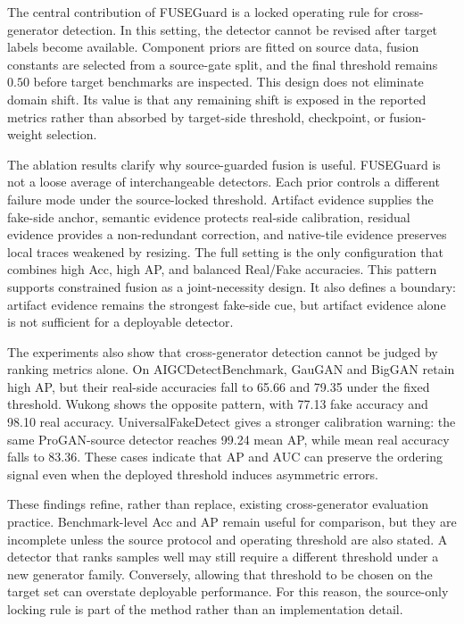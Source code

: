 \documentclass[lettersize,journal]{IEEEtran}
\begin{document}
The central contribution of FUSEGuard is a locked operating rule for cross-generator detection. In this setting, the detector cannot be revised after target labels become available. Component priors are fitted on source data, fusion constants are selected from a source-gate split, and the final threshold remains $0.50$ before target benchmarks are inspected. This design does not eliminate domain shift. Its value is that any remaining shift is exposed in the reported metrics rather than absorbed by target-side threshold, checkpoint, or fusion-weight selection.

The ablation results clarify why source-guarded fusion is useful. FUSEGuard is not a loose average of interchangeable detectors. Each prior controls a different failure mode under the source-locked threshold. Artifact evidence supplies the fake-side anchor, semantic evidence protects real-side calibration, residual evidence provides a non-redundant correction, and native-tile evidence preserves local traces weakened by resizing. The full setting is the only configuration that combines high Acc, high AP, and balanced Real/Fake accuracies. This pattern supports constrained fusion as a joint-necessity design. It also defines a boundary: artifact evidence remains the strongest fake-side cue, but artifact evidence alone is not sufficient for a deployable detector.

The experiments also show that cross-generator detection cannot be judged by ranking metrics alone. On AIGCDetectBenchmark, GauGAN and BigGAN retain high AP, but their real-side accuracies fall to 65.66 and 79.35 under the fixed threshold. Wukong shows the opposite pattern, with 77.13 fake accuracy and 98.10 real accuracy. UniversalFakeDetect gives a stronger calibration warning: the same ProGAN-source detector reaches 99.24 mean AP, while mean real accuracy falls to 83.36. These cases indicate that AP and AUC can preserve the ordering signal even when the deployed threshold induces asymmetric errors.

These findings refine, rather than replace, existing cross-generator evaluation practice. Benchmark-level Acc and AP remain useful for comparison, but they are incomplete unless the source protocol and operating threshold are also stated. A detector that ranks samples well may still require a different threshold under a new generator family. Conversely, allowing that threshold to be chosen on the target set can overstate deployable performance. For this reason, the source-only locking rule is part of the method rather than an implementation detail.
\end{document}
